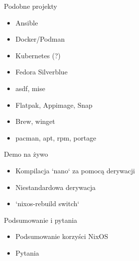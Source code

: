 \documentclass{beamer}
\begin{document}
\begin{frame}{Podobne projekty}
    \begin{itemize}
        \item Ansible
        \item Docker/Podman
        \item Kubernetes (?)
        \item Fedora Silverblue
        \item asdf, mise
        \item Flatpak, Appimage, Snap
        \item Brew, winget
        \item pacman, apt, rpm, portage
    \end{itemize}
\end{frame}

\begin{frame}{Demo na żywo}
    \begin{itemize}
        \item Kompilacja `nano` za pomocą derywacji
        \item Niestandardowa derywacja
        \item `nixos-rebuild switch`
    \end{itemize}
\end{frame}

\begin{frame}{Podsumowanie i pytania}
    \begin{itemize}
        \item Podsumowanie korzyści NixOS
        \item Pytania
    \end{itemize}
\end{frame}
\end{document}
